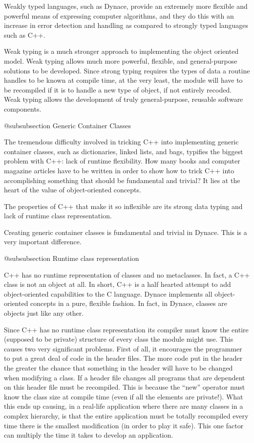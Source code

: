 Weakly typed languages, such as Dynace, provide an extremely more
flexible and powerful means of expressing computer algorithms, and
they do this with an increase in error detection and handling as
compared to strongly typed languages such as C++.

Weak typing is a much stronger approach to implementing the object
oriented model.  Weak typing allows much more powerful, flexible, and
general-purpose solutions to be developed.  Since strong typing
requires the types of data a routine handles to be known at compile time,
at the very least, the module will have to be recompiled if it is to
handle a new type of object, if not entirely recoded.  Weak typing
allows the development of truly general-purpose, reusable software
components.

@subsubsection Generic Container Classes

The tremendous difficulty involved in tricking C++ into implementing
generic container classes, such as dictionaries, linked lists, and bags,
typifies the biggest problem with C++: lack of runtime flexibility.
How many books and computer magazine articles have to be written
in order to show how to trick C++ into accomplishing something
that should be fundamental and trivial?  It lies at the heart of
the value of object-oriented concepts.

The properties of C++ that make it so inflexible are its strong data
typing and lack of runtime class representation.

Creating generic container classes is fundamental and trivial in Dynace.
This is a very important difference.

@subsubsection Runtime class representation

C++ has no runtime representation of classes and no metaclasses.  In
fact, a C++ class is not an object at all.  In short, C++ is a half
hearted attempt to add object-oriented capabilities to the C language.
Dynace implements all object-oriented concepts in a pure, flexible fashion.
In fact, in Dynace, classes are objects just like any other.

Since C++ has no runtime class representation its compiler must know
the entire (supposed to be private) structure of every class the module
might use.  This causes two very significant problems.  First of all,
it encourages the programmer to put a great deal of code in the header
files.  The more code put in the header the greater the chance that
something in the header will have to be changed when modifying a class.
If a header file changes all programs that are dependent on this
header file must be recompiled.  This is because the ``new'' operator
must know the class size at compile time (even if all the elements are
private!).  What this ends up causing, in a real-life application
where there are many classes in a complex hierarchy, is that the
entire application must be totally recompiled every time there is the
smallest modification (in order to play it safe).  This one factor can
multiply the time it takes to develop an application.

